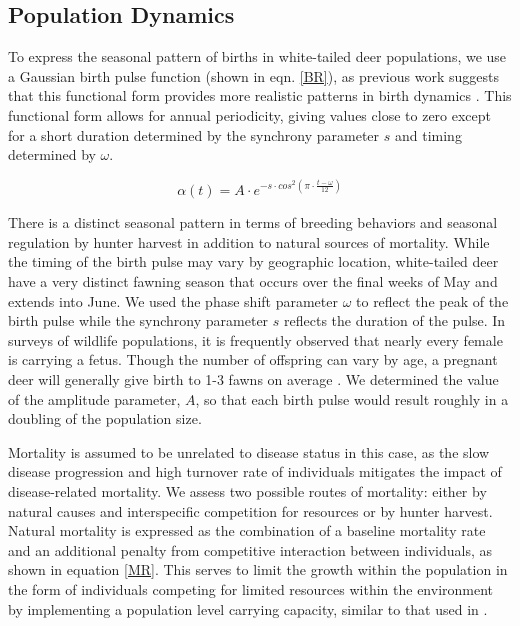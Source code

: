 \documentclass[number,preprint,review,12pt]{elsarticle}
\begin{document}
\subsection{Population Dynamics}\label{popDySec}
\doublespacing
To express the seasonal pattern of births in white-tailed deer populations, we use a Gaussian birth pulse function (shown in eqn. \ref{BR}), as previous work suggests that this functional form provides more realistic patterns in birth dynamics \citep{webb2014}. This functional form allows for annual periodicity, giving values close to zero except for a short duration determined by the synchrony parameter $s$ and timing determined by $\omega$. 

\begin{equation}
    \alpha(t) = A\cdot e^{-s\cdot cos^2\left(\pi\cdot\frac{t-\omega}{12}\right)}
    \label{BR}
\end{equation}

There is a distinct seasonal pattern in terms of breeding behaviors and seasonal regulation by hunter harvest in addition to natural sources of mortality. While the timing of the birth pulse may vary by geographic location, white-tailed deer have a very distinct fawning season that occurs over the final weeks of May and extends into June. We used the phase shift parameter $\omega$ to reflect the peak of the birth pulse while the synchrony parameter $s$ reflects the duration of the pulse. In surveys of wildlife populations, it is frequently observed that nearly every female is carrying a fetus. Though the number of offspring can vary by age, a pregnant deer will generally give birth to 1-3 fawns on average \citep{repro_1999}. We determined the value of the amplitude parameter, $A$, so that each birth pulse would result roughly in a doubling of the population size. 

Mortality is assumed to be unrelated to disease status in this case, as the slow disease progression and high turnover rate of individuals mitigates the impact of disease-related mortality. We assess two possible routes of mortality: either by natural causes and interspecific competition for resources or by hunter harvest. Natural mortality is expressed as the combination of a baseline mortality rate and an additional penalty from competitive interaction between individuals, as shown in equation \ref{MR}. This serves to limit the growth within the population in the form of individuals competing for limited resources within the environment by implementing a population level carrying capacity, similar to that used in \citet{Ramsey2010}.
\end{document}
